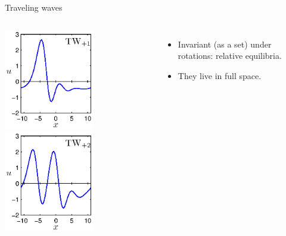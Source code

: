\documentclass{beamer}
\begin{document}
\begin{frame}{Traveling waves}
 \begin{columns}
 \includegraphics[width=0.6\textwidth,clip=true]{../../figs/ks22_TW1_profile}\\
 \includegraphics[width=0.6\textwidth,clip=true]{../../figs/ks22_TW2_profile}%
 \begin{itemize}
 \item Invariant (as a set) under rotations: relative equilibria.
 \item They live in full space.
\end{itemize}

 \end{columns}
\end{frame}
\end{document}
